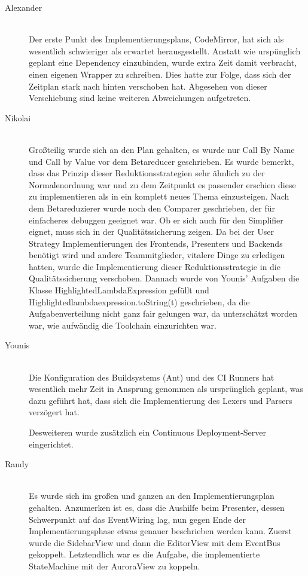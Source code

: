 \documentclass[parskip=full,11pt,twoside]{scrartcl}
\begin{document}
\begin{description}

\item [Alexander]\hfill \\
Der erste Punkt des Implementierungsplans, CodeMirror, hat sich als wesentlich schwieriger als erwartet herausgestellt.
Anstatt wie urspünglich geplant eine Dependency einzubinden, wurde extra Zeit damit verbracht, einen eigenen Wrapper zu schreiben.
Dies hatte zur Folge, dass sich der Zeitplan stark nach hinten verschoben hat.
Abgesehen von dieser Verschiebung sind keine weiteren Abweichungen aufgetreten.
\item [Nikolai]\hfill \\
Großteilig wurde sich an den Plan gehalten, es wurde nur Call By Name und Call by Value vor dem Betareducer geschrieben.
Es wurde  bemerkt, dass das Prinzip dieser Reduktionsstrategien sehr ähnlich zu der Normalenordnung war und zu dem Zeitpunkt es passender erschien diese zu implementieren als in ein komplett neues Thema einzusteigen.
Nach dem Betareduzierer wurde noch den Comparer geschrieben, der für einfacheres debuggen geeignet war. Ob er sich auch für den Simplifier eignet, muss sich in der Qualitätssicherung zeigen.
Da bei der User Strategy Implementierungen des Frontends, Presenters und Backends benötigt wird und andere Teammitglieder, vitalere Dinge zu erledigen hatten,
wurde die Implementierung dieser Reduktionsstrategie in die Qualitätssicherung verschoben.
Dannach wurde von Younis' Aufgaben die Klasse HighlightedLambdaExpression gefüllt und  Highlightedlambdaexpression.toString(t) geschrieben, da die Aufgabenverteilung nicht ganz fair gelungen war, da unterschätzt worden war, wie aufwändig die Toolchain einzurichten war.

\item [Younis]\hfill \\
Die Konfiguration des Buildsystems (Ant) und des CI Runners hat wesentlich mehr Zeit in Ansprung genommen
als ursprünglich geplant, was dazu geführt hat, dass sich die Implementierung des Lexers und Parsers verzögert hat.

Desweiteren wurde zusätzlich ein Continuous Deployment-Server eingerichtet.
\item [Randy]\hfill \\
Es wurde sich im großen und ganzen an den Implementierungsplan gehalten. Anzumerken ist es, dass die Aushilfe beim Presenter, dessen Schwerpunkt auf das EventWiring lag, nun gegen
Ende der Implementierungsphase etwas genauer beschrieben werden kann. Zuerst wurde die SidebarView und dann die EditorView mit dem EventBus gekoppelt.
Letztendlich war es die Aufgabe, die implementierte StateMachine mit der AuroraView zu koppeln.

\end{description}
\end{document}
